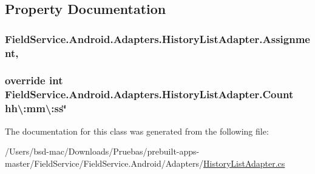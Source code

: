 \subsection{Property Documentation}
\hypertarget{class_field_service_1_1_android_1_1_adapters_1_1_history_list_adapter_a5eb165ed9d002384af0009445e3648ac}{
\subsubsection[{Assignment}]{ Field\+Service.\+Android.\+Adapters.\+History\+List\+Adapter.\+Assignment\hspace{0.3cm}{\ttfamily [get]}, {\ttfamily [set]}}}\label{class_field_service_1_1_android_1_1_adapters_1_1_history_list_adapter_a5eb165ed9d002384af0009445e3648ac}
\hypertarget{class_field_service_1_1_android_1_1_adapters_1_1_history_list_adapter_a496b8e151dd68cf51e73decfd8eae66d}{
\subsubsection[{Count}]{\setlength{\rightskip}{0pt plus 5cm}override int Field\+Service.\+Android.\+Adapters.\+History\+List\+Adapter.\+Count hh\textbackslash{}\+:mm\textbackslash{}\+:ss\char`\"{}\hspace{0.3cm}{\ttfamily [get]}}}\label{class_field_service_1_1_android_1_1_adapters_1_1_history_list_adapter_a496b8e151dd68cf51e73decfd8eae66d}


The documentation for this class was generated from the following file\+:\begin{DoxyCompactItemize}
\item 
/\+Users/bsd-\/mac/\+Downloads/\+Pruebas/prebuilt-\/apps-\/master/\+Field\+Service/\+Field\+Service.\+Android/\+Adapters/\hyperlink{_history_list_adapter_8cs}{History\+List\+Adapter.\+cs}\end{DoxyCompactItemize}
